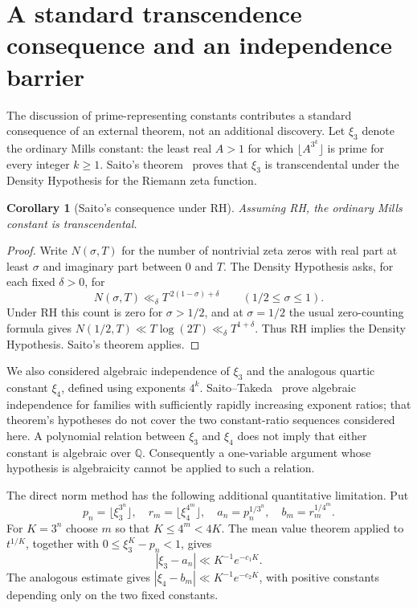 \documentclass[11pt,a4paper]{article}
\newtheorem{corollary}[theorem]{Corollary}
\theoremstyle{definition}
\theoremstyle{remark}
\begin{document}
\section{A standard transcendence consequence and an independence barrier}
\label{p-sec:transcendence-scope}

The discussion of prime-representing constants contributes a standard
consequence of an external theorem, not an additional discovery.
Let $\xi_3$ denote the ordinary Mills constant: the least real
$A>1$ for which $\lfloor A^{3^k}\rfloor$ is prime for every integer
$k\geq1$. Saito's theorem~\cite[Theorem 1.8]{p-Saito2026} proves that
$\xi_3$ is transcendental under the Density Hypothesis for the
Riemann zeta function.

\begin{corollary}[Saito's consequence under RH]\label{p-cor:mills}
Assuming RH, the ordinary Mills constant is transcendental.
\end{corollary}
\begin{proof}
Write $N(\sigma,T)$ for the number of nontrivial zeta zeros with
real part at least $\sigma$ and imaginary part between $0$ and $T$.
The Density Hypothesis asks, for each fixed $\delta>0$, for
\[
 N(\sigma,T)\ll_\delta T^{\,2(1-\sigma)+\delta}
 \qquad(1/2\leq\sigma\leq1).
\]
Under RH this count is zero for $\sigma>1/2$, and at $\sigma=1/2$
the usual zero-counting formula gives
$N(1/2,T)\ll T\log(2T)\ll_\delta T^{1+\delta}$.
Thus RH implies the Density Hypothesis. Saito's theorem applies.
\end{proof}

We also considered algebraic independence of $\xi_3$ and the analogous
quartic constant $\xi_4$, defined using exponents $4^k$.
Saito--Takeda~\cite{p-ST2022} prove algebraic independence for families
with sufficiently rapidly increasing exponent ratios; that theorem's
hypotheses do not cover the two constant-ratio sequences considered
here. A polynomial relation between $\xi_3$ and $\xi_4$ does not imply
that either constant is algebraic over $\mathbb Q$. Consequently a
one-variable argument whose hypothesis is algebraicity cannot be
applied to such a relation.

The direct norm method has the following additional quantitative
limitation. Put
\[
 p_n=\lfloor\xi_3^{3^n}\rfloor,\quad
 r_m=\lfloor\xi_4^{4^m}\rfloor,\quad
 a_n=p_n^{1/3^n},\quad b_m=r_m^{1/4^m}.
\]
For $K=3^n$ choose $m$ so that $K\leq4^m<4K$.
The mean value theorem applied to $t^{1/K}$, together with
$0\leq\xi_3^K-p_n<1$, gives
\[
 |\xi_3-a_n|\ll K^{-1}e^{-c_1K}.
\]
The analogous estimate gives
$|\xi_4-b_m|\ll K^{-1}e^{-c_2K}$, with positive constants depending
only on the two fixed constants.
\end{document}
